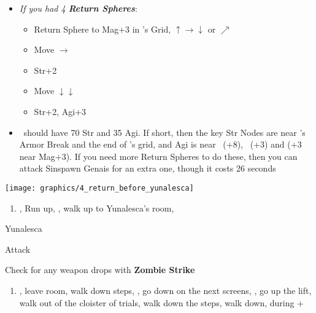 \begin{spheregrid}
	\begin{itemize}
		\item \textit{If you had 4 \textbf{Return Spheres}}:
		      \begin{itemize}
			      \item Return Sphere to Mag+3 in \wakka's Grid, $\uparrow\rightarrow\downarrow$ or $\nearrow$
			      \item Move $\rightarrow$
			      \item Str+2
			      \item Move $\downarrow\downarrow$
			      \item Str+2, Agi+3
		      \end{itemize}
		\item \yuna\ should have 70 Str and 35 Agi. If short, then the key Str Nodes are near \tidus's Armor Break and the end of \wakka's grid, and Agi is near \lulu\ (+8), \rikku\ (+3) and \wakka (+3 near Mag+3). If you need more Return Spheres to do these, then you can attack Sinspawn Genais for an extra one, though it costs 26 seconds
	\end{itemize}
	\texttt{[image: graphics/4\_return\_before\_yunalesca]}
\end{spheregrid}
\begin{enumerate}[resume]
	\item \save, Run up, \sd, walk up to Yunalesca's room, \sd
\end{enumerate}
\begin{battle}[132000]{Yunalesca}
	\begin{itemize}
		\summon{\bahamut}
		\bahamutf Attack
	\end{itemize}
	Check for any weapon drops with \textbf{Zombie Strike}
\end{battle}
\begin{enumerate}[resume]
	\item \sd, leave room, walk down steps, \sd, go down on the next screens, \save, go up the lift, walk out of the cloister of trials, walk down the steps, walk down, \sd during \cs+\skippablefmv
\end{enumerate}